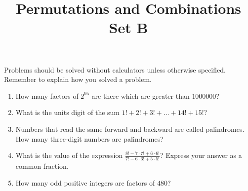 \documentclass{article}
\title{Permutations and Combinations Set B}
\author{}
\date{}
\begin{document}
    \maketitle
    \noindent Problems should be solved without calculators unless otherwise specified.
    Remember to explain how you solved a problem.
    \begin{enumerate}
        \item How many factors of $2^{95}$ are there which are greater than $1000000$?
        \vspace{3cm}
        \item What is the units digit of the sum $1! + 2! + 3! + \dots + 14! + 15!$?
        \vspace{3cm}
        \item Numbers that read the same forward and backward are called palindromes. How many
        three-digit numbers are palindromes?
        \pagebreak
        \item What is the value of the expression $\frac{8! - 7 \cdot 7! + 6 \cdot 6!}
        {7! - 6 \cdot 6! + 5 \cdot 5!}$? Express your answer as a common fraction.
        \vspace{3cm}
        \item How many odd positive integers are factors of $480$?
        \vspace{3cm}
    \end{enumerate}
\end{document}
